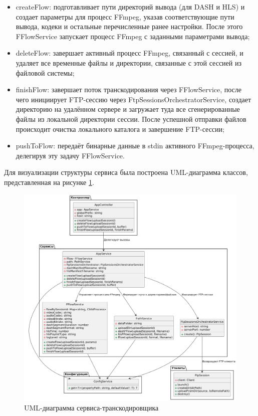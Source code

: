 	\begin{itemize}[label=$\bullet$]
		\item createFlow: подготавливает пути директорий вывода (для DASH и HLS) и создает параметры для процесс FFmpeg, указав соответствующие пути вывода, кодеки и остальные перечисленные ранее настройки. После этого FFlowService запускает процесс FFmpeg с заданными параметрами вывода;
		\item deleteFlow: завершает активный процесс FFmpeg, связанный с сессией, и удаляет все временные файлы и директории, связанные с этой сессией из файловой системы;
		\item finishFlow: завершает поток транскодирования через FFlowService, после чего инициирует FTP-сессию через FtpSessionsOrchestratorService, создает директорию на удалённом сервере и загружает туда все сгенерированные файлы из локальной директории сессии. После успешной отправки файлов происходит очистка локального каталога и завершение FTP-сессии;
		\item pushToFlow: передаёт бинарные данные в stdin активного FFmpeg-процесса, делегируя эту задачу FFlowService.
	\end{itemize}

	Для визуализации структуры сервиса была построена UML-диаграмма классов, представленная на рисунке \ref{fig:uml_fflow}.

	\begin{figure}[ht!] 
		\center
		\includegraphics [scale=0.37] {my_folder/images//uml_fflow}
		\caption{UML-диаграмма сервиса-транскодировщика} 
		\label{fig:uml_fflow}  
	\end{figure}

